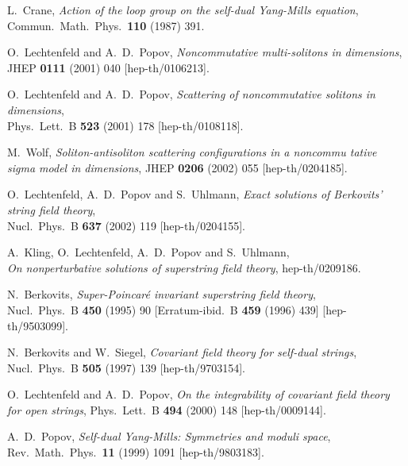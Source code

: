 \documentclass[a4paper,11pt,english]{article}
\numberwithin{equation}{section}
\renewcommand{\=}{\ =\ }
\begin{document}
\begin{thebibliography}{99}
       L.~Crane,
       {\em Action of the loop group on the self-dual Yang-Mills equation},\\
       Commun.\ Math.\ Phys.\  {\bf 110} (1987) 391.

         O.~Lechtenfeld and A.~D.~Popov,
         {\em Noncommutative multi-solitons in \coordHE{} dimensions},\\
         JHEP {\bf 0111} (2001) 040
         [hep-th/0106213].

         O.~Lechtenfeld and A.~D.~Popov,
         {\em Scattering of noncommutative solitons in \coordHE{} dimensions},\\
         Phys.\ Lett.\ B {\bf 523} (2001) 178
         [hep-th/0108118].

         M.~Wolf,
         {\em Soliton-antisoliton scattering configurations in a noncommu%
tative sigma model in \coordHE{} dimensions},
         JHEP {\bf 0206} (2002) 055
         [hep-th/0204185].

         O.~Lechtenfeld, A.~D.~Popov and S.~Uhlmann,
         {\em Exact solutions of Berkovits' string field theory},\\
         Nucl.\ Phys.\ B {\bf 637} (2002) 119
         [hep-th/0204155].

         A.~Kling, O.~Lechtenfeld, A.~D.~Popov and S.~Uhlmann,\\
         {\em On nonperturbative solutions of superstring field theory},
         hep-th/0209186.

         N.~Berkovits,
         {\em Super-Poincar\'e invariant superstring field theory},\\
         Nucl.\ Phys.\ B {\bf 450} (1995) 90
         [Erratum-ibid.\ B {\bf 459} (1996) 439]
         [hep-th/9503099].

	 N.~Berkovits and W.~Siegel,
	 {\em Covariant field theory for self-dual strings},\\
	 Nucl.\ Phys.\ B {\bf 505} (1997) 139
	 [hep-th/9703154].

         O.~Lechtenfeld and A.~D.~Popov,
         {\em On the integrability of covariant field theory for 
              open \coordHE{} strings},
         Phys.\ Lett.\ B {\bf 494} (2000) 148
         [hep-th/0009144].

         A.~D.~Popov,
         {\em Self-dual Yang-Mills: Symmetries and moduli space},\\
         Rev.\ Math.\ Phys.\  {\bf 11} (1999) 1091
         [hep-th/9803183].

\end{thebibliography}
\end{document}
